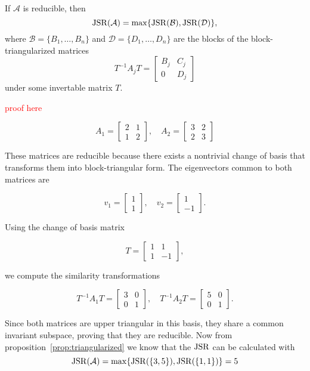 \begin{proposition}
    \label{prop:triangularized}
    If $\mathcal{A}$ is reducible, then 
    \begin{equation}
        \operatorname{JSR}(\mathcal{A}) = \max \{ \operatorname{JSR}(\mathcal{B}), \operatorname{JSR}(\mathcal{D}) \},
    \end{equation}
    where $\mathcal{B} = \{B_1,\dots, B_n\}$ and $\mathcal{D} = \{D_1,\dots, D_n\}$ are the blocks of the block-triangularized matrices
    \[
        T^{-1}A_jT = 
        \begin{bmatrix}
        B_j & C_j \\
        0   & D_j 
        \end{bmatrix}
    \]
    under some invertable matrix $T$. 
\end{proposition}
\textcolor{red}{proof here}
\begin{example}
    \[
    A_1 = \begin{bmatrix} 2 & 1 \\ 1 & 2 \end{bmatrix}, \quad
    A_2 = \begin{bmatrix} 3 & 2 \\ 2 & 3 \end{bmatrix}
    \]

    These matrices are reducible because there exists a nontrivial change of basis that transforms them into block-triangular form. The eigenvectors common to both matrices are

    \[
    v_1 = \begin{bmatrix} 1 \\ 1 \end{bmatrix}, \quad
    v_2 = \begin{bmatrix} 1 \\ -1 \end{bmatrix}.
    \]

    Using the change of basis matrix

    \[
    T = \begin{bmatrix} 1 & 1 \\ 1 & -1 \end{bmatrix},
    \]

    we compute the similarity transformations

    \[
    T^{-1} A_1 T = \begin{bmatrix} 3 & 0 \\ 0 & 1 \end{bmatrix}, \quad
    T^{-1} A_2 T = \begin{bmatrix} 5 & 0 \\ 0 & 1 \end{bmatrix}.
    \]

    Since both matrices are upper triangular in this basis, they share a common invariant subspace, proving that they are reducible.
    Now from proposition~\ref{prop:triangularized} we know that the $\operatorname{JSR}$ can be calculated with 
    \[ 
    \operatorname{JSR}(\mathcal{A}) = \max \{ \operatorname{JSR}(\{3,5\}), \operatorname{JSR}(\{1,1\})\} = 5
    \]
\end{example}

